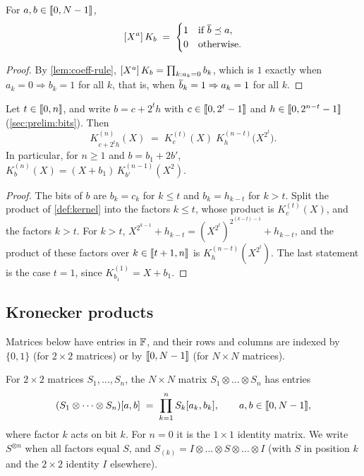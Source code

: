 \begin{corollary}\label{cor:bool-coeff}
For $a, b \in \llbracket 0, N-1 \rrbracket$,
\[
  [X^{a}]\,K_b \;=\;
  \begin{cases}
    1 & \text{if } \overline{b} \preceq a,\\
    0 & \text{otherwise.}
  \end{cases}
\]
\end{corollary}

\begin{proof}
By \cref{lem:coeff-rule}, $[X^{a}]\,K_b = \prod_{k : a_k = 0} b_k$, which is $1$ exactly when $a_k = 0 \Rightarrow b_k = 1$ for all $k$, that is, when $\overline{b}_k = 1 \Rightarrow a_k = 1$ for all $k$.
\end{proof}

\begin{lemma}[Recursion]\label{lem:recursion}
Let $t \in \llbracket 0, n \rrbracket$, and write $b = c + 2^t h$ with $c \in \llbracket 0, 2^t-1 \rrbracket$ and $h \in \llbracket 0, 2^{n-t}-1 \rrbracket$ (\cref{sec:prelim:bits}). Then
\[
  K^{(n)}_{c + 2^t h}(X) \;=\; K^{(t)}_c(X)\; K^{(n-t)}_h\bigl(X^{2^t}\bigr).
\]
In particular, for $n \ge 1$ and $b = b_1 + 2b'$, $K^{(n)}_b(X) = (X + b_1)\, K^{(n-1)}_{b'}(X^2)$.
\end{lemma}

\begin{proof}
The bits of $b$ are $b_k = c_k$ for $k \le t$ and $b_k = h_{k-t}$ for $k > t$.
Split the product of \cref{def:kernel} into the factors $k \le t$, whose product is $K^{(t)}_c(X)$, and the factors $k > t$.
For $k > t$, $X^{2^{k-1}} + h_{k-t} = (X^{2^t})^{2^{(k-t)-1}} + h_{k-t}$, and the product of these factors over $k \in \llbracket t+1, n \rrbracket$ is $K^{(n-t)}_h(X^{2^t})$.
The last statement is the case $t = 1$, since $K^{(1)}_{b_1} = X + b_1$.
\end{proof}

\subsection{Kronecker products}\label{sec:kernel:kron}

Matrices below have entries in $\mathbb{F}$, and their rows and columns are indexed by $\{0,1\}$ (for $2 \times 2$ matrices) or by $\llbracket 0, N-1 \rrbracket$ (for $N \times N$ matrices).

\begin{definition}\label{def:kron}
For $2 \times 2$ matrices $S_1,\dots,S_n$, the $N \times N$ matrix $S_1 \otimes \dots \otimes S_n$ has entries
\[
  (S_1 \otimes \dots \otimes S_n)[a,b] \;=\; \prod_{k=1}^{n} S_k[a_k, b_k], \qquad a, b \in \llbracket 0, N-1 \rrbracket,
\]
where factor $k$ acts on bit $k$. For $n = 0$ it is the $1 \times 1$ identity matrix.
We write $S^{\otimes n}$ when all factors equal $S$, and $S_{(k)} = I \otimes \dots \otimes S \otimes \dots \otimes I$ (with $S$ in position $k$ and the $2 \times 2$ identity $I$ elsewhere).
\end{definition}

